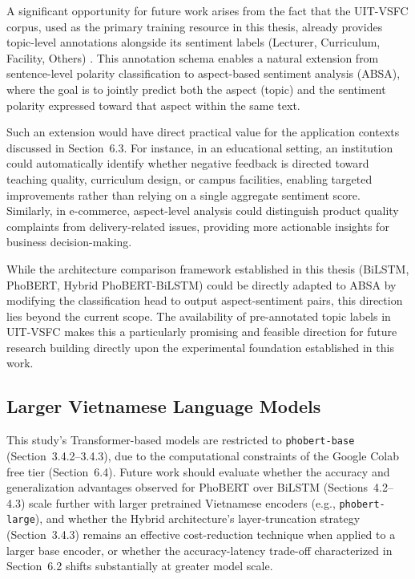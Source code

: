 \documentclass[12pt]{report} %
\begin{document}
A significant opportunity for future work arises from the fact that the UIT-VSFC corpus, used as the primary training resource in this thesis, already provides topic-level annotations alongside its sentiment labels (Lecturer, Curriculum, Facility, Others) \cite{nguyen2018uitvsfc}. This annotation schema enables a natural extension from sentence-level polarity classification to aspect-based sentiment analysis (ABSA), where the goal is to jointly predict both the aspect (topic) and the sentiment polarity expressed toward that aspect within the same text.

Such an extension would have direct practical value for the application contexts discussed in Section~6.3. For instance, in an educational setting, an institution could automatically identify whether negative feedback is directed toward teaching quality, curriculum design, or campus facilities, enabling targeted improvements rather than relying on a single aggregate sentiment score. Similarly, in e-commerce, aspect-level analysis could distinguish product quality complaints from delivery-related issues, providing more actionable insights for business decision-making.

While the architecture comparison framework established in this thesis (BiLSTM, PhoBERT, Hybrid PhoBERT-BiLSTM) could be directly adapted to ABSA by modifying the classification head to output aspect-sentiment pairs, this direction lies beyond the current scope. The availability of pre-annotated topic labels in UIT-VSFC makes this a particularly promising and feasible direction for future research building directly upon the experimental foundation established in this work.

\subsection{Larger Vietnamese Language Models}
This study's Transformer-based models are restricted to \texttt{phobert-base} (Section~3.4.2--3.4.3), due to the computational constraints of the Google Colab free tier (Section~6.4). Future work should evaluate whether the accuracy and generalization advantages observed for PhoBERT over BiLSTM (Sections~4.2--4.3) scale further with larger pretrained Vietnamese encoders (e.g., \texttt{phobert-large}), and whether the Hybrid architecture's layer-truncation strategy (Section~3.4.3) remains an effective cost-reduction technique when applied to a larger base encoder, or whether the accuracy-latency trade-off characterized in Section~6.2 shifts substantially at greater model scale.
\end{document}
